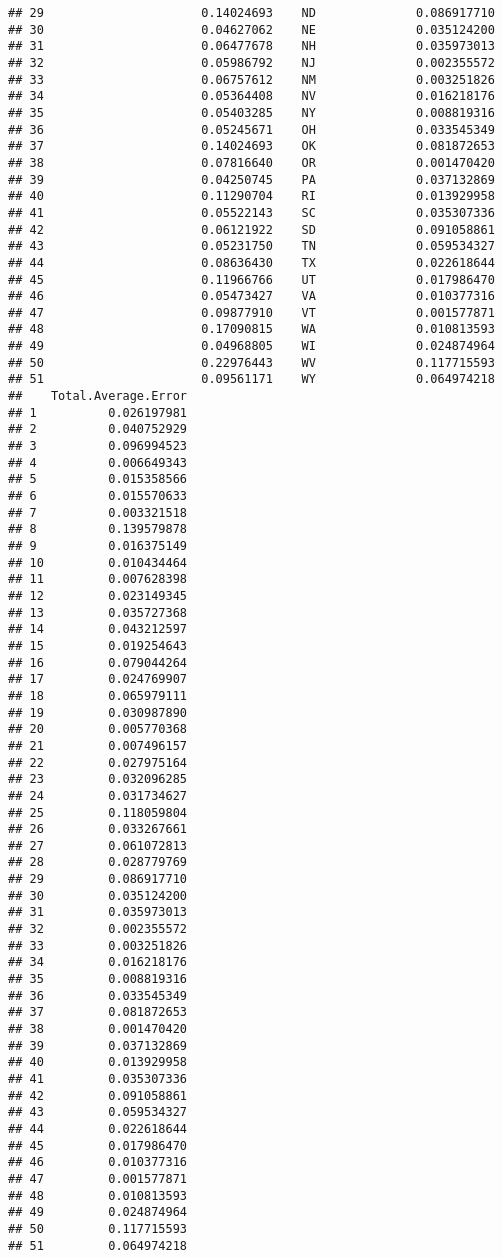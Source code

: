 \documentclass{article}\usepackage[]{graphicx}\usepackage[]{color}
\makeatletter
\newenvironment{kframe}{%
 \def\at@end@of@kframe{}%
 \ifinner\ifhmode%
  \def\at@end@of@kframe{\end{minipage}}%
  \begin{minipage}{\columnwidth}%
 \fi\fi%
 \def\FrameCommand##1{\hskip\@totalleftmargin \hskip-\fboxsep
 \colorbox{shadecolor}{##1}\hskip-\fboxsep
     \hskip-\linewidth \hskip-\@totalleftmargin \hskip\columnwidth}%
 \MakeFramed {\advance\hsize-\width
   \@totalleftmargin\z@ \linewidth\hsize
   \@setminipage}}%
 {\par\unskip\endMakeFramed%
 \at@end@of@kframe}
\newenvironment{knitrout}{}{} %
\makeatother
\begin{document}
\begin{knitrout}
\begin{kframe}
\begin{verbatim}
## 29                      0.14024693    ND              0.086917710
## 30                      0.04627062    NE              0.035124200
## 31                      0.06477678    NH              0.035973013
## 32                      0.05986792    NJ              0.002355572
## 33                      0.06757612    NM              0.003251826
## 34                      0.05364408    NV              0.016218176
## 35                      0.05403285    NY              0.008819316
## 36                      0.05245671    OH              0.033545349
## 37                      0.14024693    OK              0.081872653
## 38                      0.07816640    OR              0.001470420
## 39                      0.04250745    PA              0.037132869
## 40                      0.11290704    RI              0.013929958
## 41                      0.05522143    SC              0.035307336
## 42                      0.06121922    SD              0.091058861
## 43                      0.05231750    TN              0.059534327
## 44                      0.08636430    TX              0.022618644
## 45                      0.11966766    UT              0.017986470
## 46                      0.05473427    VA              0.010377316
## 47                      0.09877910    VT              0.001577871
## 48                      0.17090815    WA              0.010813593
## 49                      0.04968805    WI              0.024874964
## 50                      0.22976443    WV              0.117715593
## 51                      0.09561171    WY              0.064974218
##    Total.Average.Error
## 1          0.026197981
## 2          0.040752929
## 3          0.096994523
## 4          0.006649343
## 5          0.015358566
## 6          0.015570633
## 7          0.003321518
## 8          0.139579878
## 9          0.016375149
## 10         0.010434464
## 11         0.007628398
## 12         0.023149345
## 13         0.035727368
## 14         0.043212597
## 15         0.019254643
## 16         0.079044264
## 17         0.024769907
## 18         0.065979111
## 19         0.030987890
## 20         0.005770368
## 21         0.007496157
## 22         0.027975164
## 23         0.032096285
## 24         0.031734627
## 25         0.118059804
## 26         0.033267661
## 27         0.061072813
## 28         0.028779769
## 29         0.086917710
## 30         0.035124200
## 31         0.035973013
## 32         0.002355572
## 33         0.003251826
## 34         0.016218176
## 35         0.008819316
## 36         0.033545349
## 37         0.081872653
## 38         0.001470420
## 39         0.037132869
## 40         0.013929958
## 41         0.035307336
## 42         0.091058861
## 43         0.059534327
## 44         0.022618644
## 45         0.017986470
## 46         0.010377316
## 47         0.001577871
## 48         0.010813593
## 49         0.024874964
## 50         0.117715593
## 51         0.064974218
\end{verbatim}
\end{kframe}
\end{knitrout}
\end{document}
